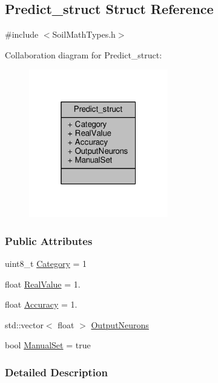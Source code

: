 \hypertarget{struct_predict__struct}{}\subsection{Predict\+\_\+struct Struct Reference}
\label{struct_predict__struct}


{\ttfamily \#include $<$Soil\+Math\+Types.\+h$>$}



Collaboration diagram for Predict\+\_\+struct\+:
\nopagebreak
\begin{figure}[H]
\begin{center}
\leavevmode
\includegraphics[width=172pt]{struct_predict__struct__coll__graph}
\end{center}
\end{figure}
\subsubsection*{Public Attributes}
\begin{DoxyCompactItemize}
\item 
uint8\+\_\+t \hyperlink{struct_predict__struct_a7d1bc56f771ba19cb333163557648714}{Category} = 1
\item 
float \hyperlink{struct_predict__struct_a09932ff9ac15e4b182bf6e53232eba0f}{Real\+Value} = 1.
\item 
float \hyperlink{struct_predict__struct_a587f18ac05cd65437327a54261d1e22c}{Accuracy} = 1.
\item 
std\+::vector$<$ float $>$ \hyperlink{struct_predict__struct_aa0708cae93baa061f21452537e86d3bd}{Output\+Neurons}
\item 
bool \hyperlink{struct_predict__struct_a9e16b308d69246f0954a4a9100fc0660}{Manual\+Set} = true
\end{DoxyCompactItemize}


\subsubsection{Detailed Description}


